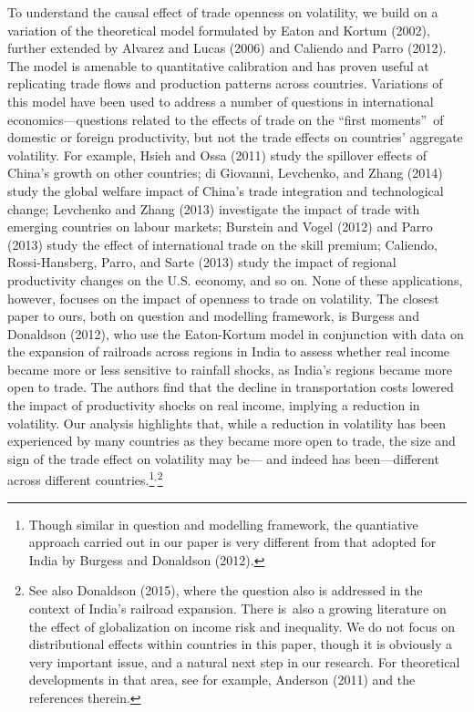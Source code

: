 \documentclass[12pt]{article}
\begin{document}
To understand the causal effect of trade openness on volatility, we build on
a variation of the theoretical model formulated by Eaton and Kortum (2002),
further extended by Alvarez and Lucas (2006) and Caliendo and Parro (2012).
The model is amenable to quantitative calibration and has proven useful at
replicating trade flows and production patterns across countries. Variations
of this model have been used to address a number of questions in
international economics---questions related to the effects of trade on the
\textquotedblleft first moments\textquotedblright\ of domestic or foreign
productivity, but not the trade effects on countries' aggregate volatility.
For example, Hsieh and Ossa (2011) study the spillover effects of China's
growth on other countries; di Giovanni, Levchenko, and Zhang (2014) study
the global welfare impact of China's trade integration and technological
change; Levchenko and Zhang (2013) investigate the impact of trade with
emerging countries on labour markets; Burstein and Vogel (2012) and Parro
(2013) study the effect of international trade on the skill premium;
Caliendo, Rossi-Hansberg, Parro, and Sarte (2013) study the impact of
regional productivity changes on the U.S. economy, and so on. None of these
applications, however, focuses on the impact of openness to trade on
volatility. The closest paper to ours, both on question and modelling
framework, is Burgess and Donaldson (2012), who use the Eaton-Kortum model
in conjunction with data on the expansion of railroads across regions in
India to assess whether real income became more or less sensitive to
rainfall shocks, as India's regions became more open to trade. The authors
find that the decline in transportation costs lowered the impact of
productivity shocks on real income, implying a reduction in volatility. Our
analysis highlights that, while a reduction in volatility has been
experienced by many countries as they became more open to trade, the size
and sign of the trade effect on volatility may be--- and indeed has
been---different across different countries.\footnote{%
Though similar in question and modelling framework, the quantiative approach
carried out in our paper is very different from that adopted for India by
Burgess and Donaldson (2012).}$^{,}$\footnote{%
See also Donaldson (2015), where the question also is addressed in the
context of India's railroad expansion. There is\ also a growing literature
on the effect of globalization on income risk and inequality. We do not
focus on distributional effects within countries in this paper, though it is
obviously a very important issue, and a natural next step in our research.
For theoretical developments in that area, see for example, Anderson (2011)
and the references therein.}
\end{document}
